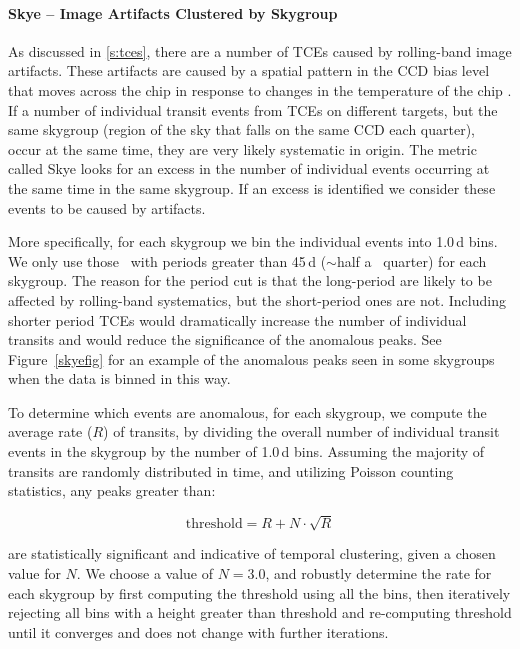\paragraph{Skye -- Image Artifacts Clustered by Skygroup}
\label{s:skye}

As discussed in \ref{s:tces}, there are a number of TCEs caused by rolling-band image artifacts. These artifacts are caused by a spatial pattern in the CCD bias level that moves across the chip in response to changes in the temperature of the chip \citep[for more detail see ][]{VanCleve2009}. If a number of individual transit events from TCEs on different targets, but the same skygroup (region of the sky that falls on the same CCD each quarter), occur at the same time, they are very likely systematic in origin. The metric called Skye looks for an excess in the number of individual events occurring at the same time in the same skygroup. If an excess is identified we consider these events to be caused by artifacts. 

More specifically, for each skygroup we bin the individual events into 1.0\,d bins. We only use those \opstce\ with periods greater than 45\,d ($\sim$half a \Kepler\ quarter) for each skygroup. The reason for the period cut is that the long-period  are likely to be affected by rolling-band systematics, but the short-period ones are not.  Including shorter period TCEs would dramatically increase the number of individual transits and would reduce the significance of the anomalous peaks.  See Figure~\ref{skyefig} for an example of the anomalous peaks seen in some skygroups when the data is binned in this way.

To determine which events are anomalous, for each skygroup, we compute the average rate ($R$) of transits, by dividing the overall number of individual transit events in the skygroup by the number of 1.0\,d bins. Assuming the majority of transits are randomly distributed in time, and utilizing Poisson counting statistics, any peaks greater than:

\begin{equation}
\label{eq:skye}
\mathrm{threshold} = R + N\cdot\sqrt{R}
\end{equation}

\noindent are statistically significant and indicative of temporal clustering, given a chosen value for $N$. We choose a value of $N = 3.0$, and robustly determine the rate for each skygroup by first computing the threshold using all the bins, then iteratively rejecting all bins with a height greater than threshold and re-computing threshold until it converges and does not change with further iterations.

